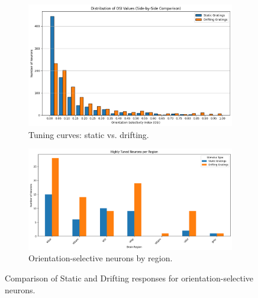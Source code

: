 \documentclass[10pt,twocolumn]{article}
\begin{document}
\begin{figure}[H]
  \centering
  \begin{subfigure}[b]{0.48\linewidth}
    \centering
    \includegraphics[width=\linewidth]{report_images/tuning_curves_comparison.png}
    \caption{Tuning curves: static vs. drifting.}
    \label{fig:tuning_comparison}
  \end{subfigure}
  \hfill
  \begin{subfigure}[b]{0.48\linewidth}
    \centering
    \includegraphics[width=\linewidth]{report_images/tuned_neurons_region.png}
    \caption{Orientation-selective neurons by region.}
    \label{fig:tuned_regions}
  \end{subfigure}
  \caption{Comparison of Static and Drifting responses for orientation-selective neurons.}
  \label{fig:tuning_summary}
\end{figure}
\end{document}
